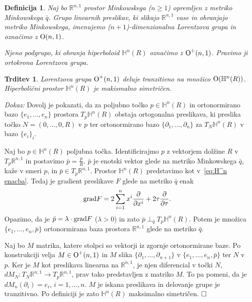 \documentclass[a4paper]{article}
\newtheorem{definicija}{Definicija}
\newtheorem{trditev}{Trditev}
\def\qed{$\hfill\Box$}   %
\begin{document}
\begin{definicija}
Naj bo $\mathbb{R}^{n,1}$ prostor Minkowskega ($n \geq 1$) opremljen z metriko Minkowskega $\bar{q}$. Grupo linearnih preslikav, ki slikajo $\mathbb{R}^{n,1}$ vase in ohranjajo metriko Minkowskega, imenujemo \emph{($n+1$)-dimenzionalna Lorentzova grupa} in označimo z $\textup{O}(n,1)$.

Njeno podgrupo, ki ohranja hiperboloid $\mathbb{H}^{n}(R)$ označimo z $\textup{O}^{+}(n,1)$. Pravimo ji \emph{ortokrona Lorentzova grupa}.
\end{definicija}

\begin{trditev} \label{trd: frame-homo}
Lorentzova grupa $\textup{O}^{+}(n,1)$ deluje tranzitivno na množico $\textup{O}(\mathbb{H}^{n}(R))$. Hiperbolični prostor $\mathbb{H}^{n}(R)$ je makismalno simetričen.
\end{trditev}

\noindent
{\em Dokaz:\/} 
Dovolj je pokazati, da za poljubno točko $p \in \mathbb{H}^{n}(R)$ in ortonormirano bazo $\{e_{1}, \dots , e_{n} \}$ prostora $T_{p}\mathbb{H}^{n}(R)$ obstaja ortogonalna preslikava, ki preslika točko $N=(0, \dots , 0, R)$ v $p$ ter ortonormirano bazo $\{\partial_{1}, \dots , \partial_{n} \}$ za $T_{N}\mathbb{H}^{n}(R)$ v bazo $\{e_{i}\}_{i}$.

Naj bo $p \in \mathbb{H}^{n}(R)$ poljubna točka. Identificirajmo $p$ z vektorjem dolžine $R$ v $T_{p}\mathbb{R}^{n,1}$  in postavimo $\bar{p} = \frac{p}{R}$. $\bar{p}$ je enotski vektor glede na metriko Minkowskega $\bar{q}$, kaže v smeri $p$, in $\bar{p} \in T_{p}\mathbb{R}^{n,1}$.
Prostor $\mathbb{H}^{n}(R)$ predstavimo kot v~\ref{eq:H^n enacba}.
Tedaj je gradient preslikave $F$ glede na metriko $\bar{q}$ enak
\begin{equation}
\textup{grad} F = 2 \sum_{i=1}^{n} x^{i} \frac{\partial}{\partial x^{i}} + 2\tau \frac{\partial}{\partial \tau}. \nonumber
\end{equation} 
Opazimo, da je $\bar{p} = \lambda \cdot \textup{grad} F$ ($\lambda > 0$) in zato $\bar{p} \perp_{\bar{q}} T_{p}\mathbb{H}^{n}(R)$.
Potem je množica $\{ e_{1}, \dots , e_{n}, \bar{p} \}$ ortonormirana baza prostora $\mathbb{R}^{n,1}$ glede na metriko $\bar{q}$.

Naj bo $M$ matrika, katere stolpci so vektorji iz zgornje ortonormirane baze. Po konstrukciji velja $M \in \textup{O}^{+}(n,1)$ in $M$ slika $\{\partial_{1}, \dots , \partial_{n+1} \}$ v $\{e_{1}, \dots , e_{n}, \bar{p} \}$ ter $N$ v $p$.
Ker je $M$ kot preslikava linearna na $\mathbb{R}^{n,1}$, je njen diferencial v točki $N$, $dM_{N} \colon T_{N}\mathbb{R}^{n,1} \to T_{p}\mathbb{R}^{n,1}$, prav tako predstavljen z matriko $M$. To pa pomeni, da je $dM_{n}(\partial_{i}) = e_{i}$, $i = 1, \dots , n$.
$M$ je iskana preslikava in delovanje grupe je tranzitivno. Po definiciji je zato $\mathbb{H}^{n}(R)$ maksimalno simetričen.
\qed
\newline
\end{document}
